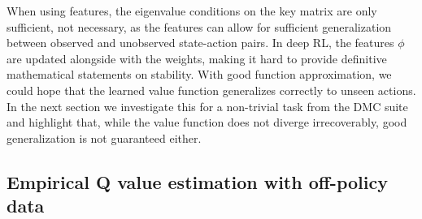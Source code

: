 When using features, the eigenvalue conditions on the key matrix are only sufficient, not necessary, as the features can allow for sufficient generalization between observed and unobserved state-action pairs.
In deep RL, the features $\phi$ are updated alongside with the weights, making it hard to provide definitive mathematical statements on stability.
With good function approximation, we could hope that the learned value function generalizes correctly to unseen actions.
In the next section we investigate this for a non-trivial task from the DMC suite and highlight that, while the value function does not diverge irrecoverably, good generalization is not guaranteed either. %

\subsection{Empirical Q value estimation with off-policy data}
\label{sec:mad:off-policy-eval-exp}

